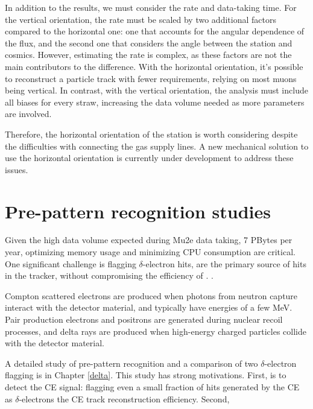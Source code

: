 In addition to the results, we must consider the rate and data-taking time. 
For the vertical orientation, the rate must be scaled by two additional 
factors compared to the horizontal one: one that accounts for the 
angular dependence of the flux, and the second one that considers the angle between the station and cosmics. 
However, estimating the rate is complex, as these factors are not the main contributors to the difference. 
With the horizontal orientation, it's possible to reconstruct a particle track with 
fewer requirements, relying on most muons being vertical. In contrast, with the 
vertical orientation, the analysis must include all biases for every straw, increasing 
the data volume needed as more parameters are involved.

Therefore, the horizontal orientation of the station is worth considering despite the difficulties
with connecting the gas supply lines.
A new mechanical solution to use the horizontal orientation is currently under development to address these issues.




\section{Pre-pattern recognition studies}

Given the high data volume expected during Mu2e data taking, 
 7 PBytes per year,
optimizing memory usage and minimizing  CPU  consumption are critical.
One significant challenge is flagging $\delta$-electron hits, 
are the primary source 
of hits in the tracker, without compromising the efficiency of 
.
.

Compton 
scattered electrons 
are produced when photons from neutron capture interact with the 
detector material, and typically have energies of a few MeV.
Pair production electrons and positrons 
are generated during nuclear recoil processes, and delta rays are produced 
when high-energy charged particles collide with the detector material.

A detailed study of pre-pattern recognition and a comparison of  two 
$\delta$-electron flagging  is 
in Chapter \ref{delta}. 
This study has strong motivations. First,  is 
to detect the CE signal: flagging even a small fraction of hits generated 
by the CE as $\delta$-electrons  the CE track 
reconstruction efficiency. 
Second, 

